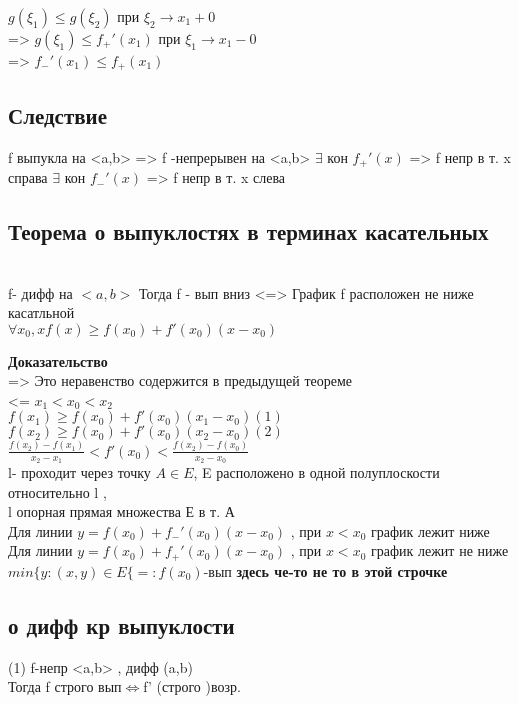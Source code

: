 ﻿\documentclass[12pt, a4paper]{article}
\newcommand{\nl}{\newline}
\begin{document}
  $g(\xi_{1}) \leq g(\xi_{2})$ при $\xi_{2} \rightarrow x_1 + 0$ \\
 => $g(\xi_{1}) \leq f_{+}'(x_{1})$ при $\xi_1 \rightarrow x_1 - 0$ \\
 => $f_{-}'(x_1)  \leq f_{+}(x_{1})$  \\
 
\subsection{Следствие} 
   f выпукла на <a,b> => f -непрерывен на <a,b> \nl
   $\exists$ кон  $f_{+}'(x)$ => f непр в т. x справа \nl
   $\exists$ кон  $f_{-}'(x)$ => f непр в т. x слева \nl
 
\subsection{Теорема о выпуклостях в терминах касательных} \\
   f- дифф на $<a,b>$ \nl
   Тогда f - вып вниз <=> График  f расположен не ниже касатльной \\
   $\forall x_{0},x f(x) \geq f(x_{0}) +f'(x_{0})(x-x_{0})$ \nl
   
\textbf{Доказательство} \\
   => Это неравенство содержится в предыдущей теореме \\
   <= $x_{1}< x_{0} < x_{2}$ \\
  $ f(x_{1})\geq f(x_{0})+f'(x_{0})(x_{1}-x_{0}) (1)$ \\
   $f(x_{2})\geq f(x_{0})+f'(x_{0})(x_{2}-x_{0}) (2)$ \\
    $\frac{f(x_2)-f(x_1)}{x_2-x_1} <f'(x_0)<\frac{f(x_2)-f(x_0)}{x_2-x_0}$   \\
 
 
l- проходит через точку $A \in E$, E расположено в одной полуплоскости относительно l ,\\
l опорная прямая множества Е в т. А\\
Для линии $y=f(x_0)+f_-'(x_0)(x-x_0)$ , при $x<x_0$ график лежит ниже  \\
Для линии $y=f(x_0)+f_+'(x_0)(x-x_0)$ , при $x<x_0$ график лежит не ниже \\
  $min\lbrace y:(x,y)\in E \lbrace =: f(x_0) $-вып \textbf{здесь че-то не то в этой строчке} \\
   \subsection{о дифф кр выпуклости}
  (1) f-непр <a,b> , дифф (a,b) \\
  Тогда  f  строго вып$ \Longleftrightarrow $f' (строго )возр. \\
  
\end{document}
